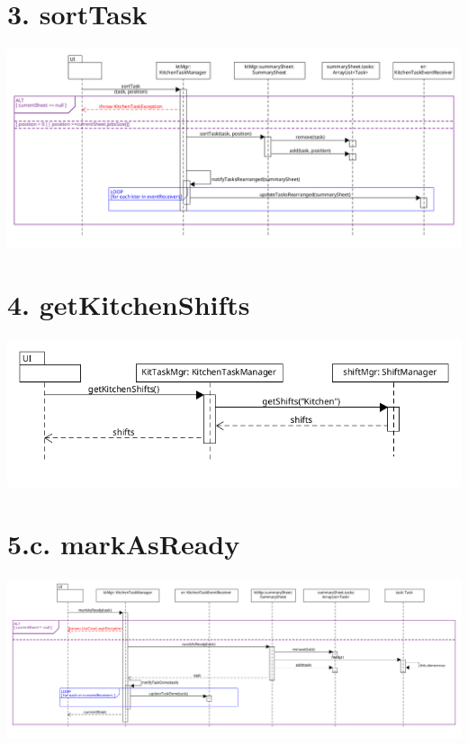 \pagebreak

\section*{3. sortTask}

\begin{center}
  \includegraphics[scale = 0.35]{images/DSD/DSD 3.png}
\end{center}

\pagebreak

\section*{4. getKitchenShifts}

\begin{center}
  \includegraphics[scale = 0.5]{images/DSD/DSD 4.png}
\end{center}

\pagebreak

\section*{5.c. markAsReady}

\begin{center}
  \includegraphics[scale = 0.27]{images/DSD/DSD 5c.png}
\end{center}

\pagebreak
